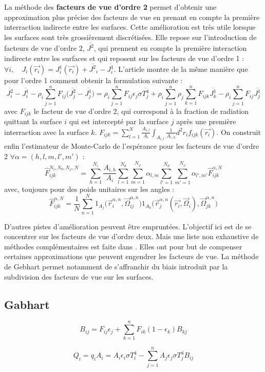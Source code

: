 La méthode des \textbf{facteurs de vue d'ordre 2} permet d'obtenir une approximation plus précise des facteurs de vue en prenant en compte la première interraction indirecte entre les surfaces. Cette amélioration est très utile lorsque les surfaces sont très grossièrement discrétisées. Elle repose sur l'introduction de facteurs de vue d'ordre 2, $\overline{J^2}$, qui prennent en compte la première interaction indirecte entre les surfaces et qui reposent sur les facteurs de vue d'ordre 1 :  $ \forall i, \quad J_i(\vec{r_i}) = J^1_i(\vec{r_i}) + \overline{J^2}_i - \overline{J^1_i} $. L'article \cite{Romain25} montre de la même manière que pour l'ordre 1 comment obtenir la formulation suivante :
\begin{equation}
    \overline{J^2_i} - \overline{J^1_i} - \rho_i \sum_{j=1}^{n} F_{ij}  \bigg(\overline{J^2_j} - \overline{J^1_j}\bigg) = \rho_i \sum_{j=1}^{n}  F_{ij} \epsilon_j \sigma \overline{T^4_j} + \rho_i \sum_{j = 1}^{n} \rho_j \sum_{k=1}^{n} F_{ijk} \overline{J^1_k} - \rho_i \sum_{j=1}^{n} F_{ij} \overline{J^1_j}
\end{equation}
avec $F_{ijk}$ le facteur de vue d'ordre 2, qui correspond à la fraction de radiation quittant la surface $i$ qui est intercepté par la surface $j$ après une première interraction avec la surface $k$. $F_{ijk} = \sum_{l=1}^{N} \frac{A_{i,l}}{A_i} \int_{A_{i,l}} \frac{1}{A_{i,h}} d^2r_i f_{ijk}(\vec{r_i})$. On construit enfin l'estimateur de Monte-Carlo de l'espérance pour les facteurs de vue d'ordre 2 $\forall \alpha = (h,l,m,l',m')$ :
\begin{equation}
    \hat{F}_{ijk}^{N_i, N_\theta, N_\varphi, N} = \sum_{h=1}^{N_i} \frac{A_{i,h}}{A_i} \sum_{l=1}^{N_\theta} \sum_{m=1}^{N_\varphi} \alpha_{l,m} \sum_{l'=1}^{N_\theta} \sum_{m'=1}^{N_\varphi} \alpha_{l',m'} \hat{F}^{\alpha,N}_{ijk}
\end{equation}
avec, toujours pour des poids unitaires sur les angles :
\begin{equation}
    \hat{F}_{ijk}^{\alpha,N} = \frac{1}{N} \sum_{n=1}^{N} 1_{A_j}\big(\vec{r}_i^{\alpha,n}, \vec{\Omega}_{ij}^{\alpha,n}\big) 1_{A_k} \big(\vec{r}_j^{\alpha,n}(\vec{r_i}, \vec{\Omega}_i), \vec{\Omega}_{jk}^{\alpha,n} \big)
\end{equation} 


D'autres pistes d'amélioration peuvent être empruntées. L'objectif ici est de se concentrer sur les facteurs de vue d'ordre deux. Mais une liste non exhaustive de méthodes complémentaires est faite dans \cite{Romain25}. Elles ont pour but de compenser certaines approximations que peuvent engendrer les facteurs de vue. La méthode de Gebhart \cite{gebhart} permet notamment de s'affranchir du biais introduit par la subdivision des facteurs de vue sur les surfaces. 

\subsection{Gabhart}
\begin{equation}
B_{ij} = F_{ij} \epsilon_j + \sum_{k=1}^n F_{ik} (1 - \epsilon_k) B_{kj}
\end{equation}


\begin{equation}
Q_i = q_i A_i = A_i \epsilon_i \sigma T_i^4 - \sum_{j=1}^nA_j\epsilon_j \sigma T_j^4 B_{ij}
\end{equation}

